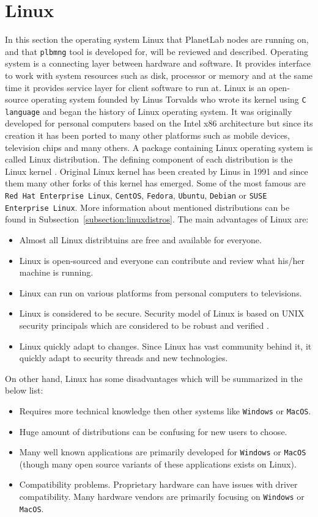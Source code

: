 \section{Linux}
In this section the operating system Linux that PlanetLab nodes are running on, and that \texttt{plbmng} tool is developed for, will be reviewed and described. Operating system is a connecting layer between hardware and software. It provides interface to work with system resources such as disk, processor or memory and at the same time it provides service layer for client software to run at. Linux is an open-source operating system founded by Linus Torvalds who wrote its kernel using \texttt{C language} and began the history of Linux operating system. It was originally developed for personal computers based on the Intel x86 architecture but since its creation it has been ported to many other platforms such as mobile devices, television chips and many others. A package containing Linux operating system is called Linux distribution. The defining component of each distribution is the Linux kernel \cite{eckert2012linux+}. Original Linux kernel has been created by Linus in 1991 \cite{linuxintro} and since them many other forks of this kernel has emerged. Some of the most famous are \texttt{Red Hat Enterprise Linux},  \texttt{CentOS}, \texttt{Fedora}, \texttt{Ubuntu},  \texttt{Debian} or \texttt{SUSE Enterprise Linux}. More information about mentioned distributions can be found in Subsection~\ref{subsection:linuxdistros}. The main advantages of Linux are:
\begin{itemize}
	\item Almost all Linux distribtuins are free and available for everyone.
	\item Linux is open-sourced and everyone can contribute and review what his/her machine is running.
	\item Linux can run on various platforms from personal computers to televisions.
	\item Linux is considered to be secure. Security model of Linux is based on UNIX security principals which are considered to be robust and verified \cite{BILHEQP2xqVnjbQi}. 
	\item Linux quickly adapt to changes. Since Linux has vast community behind it, it quickly adapt to security threads and new technologies.
\end{itemize}
On other hand, Linux has some disadvantages which will be summarized in the below list:
\begin{itemize}
	\item Requires more technical knowledge then other systems like \texttt{Windows} or \texttt{MacOS}.
	\item Huge amount of distributions can be confusing for new users to choose. 
	\item Many well known applications are primarily developed for \texttt{Windows} or \texttt{MacOS} (though many open source variants of these applications exists on Linux).
	\item Compatibility problems. Proprietary hardware can have issues with driver compatibility. Many hardware vendors are primarily focusing on \texttt{Windows} or \texttt{MacOS}.
\end{itemize}
